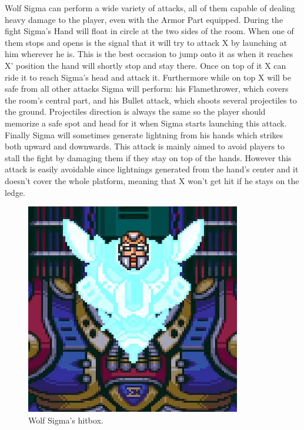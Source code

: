 Wolf Sigma can perform a wide variety of attacks, all of them capable of dealing heavy damage to the player, even with the Armor Part equipped. During the fight Sigma's Hand will float in circle at the two sides of the room. When one of them stops and opens is the signal that it will try to attack X by launching at him wherever he is. This is the best occasion to jump onto it as when it reaches X' position the hand will shortly stop and stay there. Once on top of it X can ride it to reach Sigma's head and attack it. Furthermore while on top X will be safe from all other attacks Sigma will perform: his Flamethrower, which covers the room's central part, and his Bullet attack, which shoots several projectiles to the ground. Projectiles direction is always the same so the player should memorize a safe spot and head for it when Sigma starts launching this attack. Finally Sigma will sometimes generate lightning from his hands which strikes both upward and downwards. This attack is mainly aimed to avoid players to stall the fight by damaging them if they stay on top of the hands. However this attack is easily avoidable since lightnings generated from the hand's center and it doesn't cover the whole platform, meaning that X won't get hit if he stays on the ledge. 
\begin{figure}[htp]
	\centering		
	\includegraphics[width=0.4\linewidth]{figures/X1/Sigma_stages/WolfSigma_hitbox.jpg}
	\caption{Wolf Sigma's hitbox.}
\end{figure}


